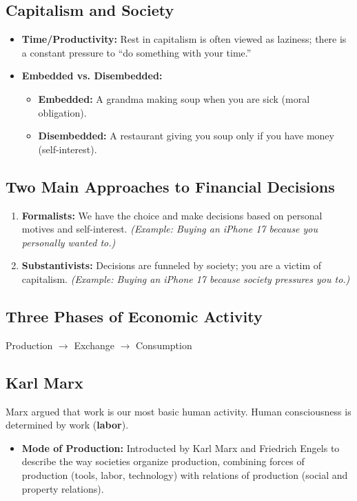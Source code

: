 \documentclass{article}
\begin{document}
\subsection{Capitalism and Society}
\begin{itemize}
    \item \textbf{Time/Productivity:} Rest in capitalism is often viewed as laziness; there is a constant pressure to ``do something with your time.''
    \item \textbf{Embedded vs. Disembedded:} 
    \begin{itemize}
        \item \textbf{Embedded:} A grandma making soup when you are sick (moral obligation).
        \item \textbf{Disembedded:} A restaurant giving you soup only if you have money (self-interest).
    \end{itemize}
\end{itemize}

\subsection{Two Main Approaches to Financial Decisions}
\begin{enumerate}
    \item \textbf{Formalists:} We have the choice and make decisions based on personal motives and self-interest. 
    \textit{(Example: Buying an iPhone 17 because you personally wanted to.)}
    \item \textbf{Substantivists:} Decisions are funneled by society; you are a victim of capitalism. 
    \textit{(Example: Buying an iPhone 17 because society pressures you to.)}
\end{enumerate}

\subsection{Three Phases of Economic Activity}
Production $\rightarrow$ Exchange $\rightarrow$ Consumption

\subsection{Karl Marx}
Marx argued that work is our most basic human activity. Human consciousness is determined by work (\textbf{labor}).
\begin{itemize}
    \item \textbf{Mode of Production:} Introducted by Karl Marx and Friedrich Engels to
describe the way societies organize production,
combining forces of production (tools, labor, technology)
with relations of production (social and property
relations).
\end{itemize}
\end{document}
